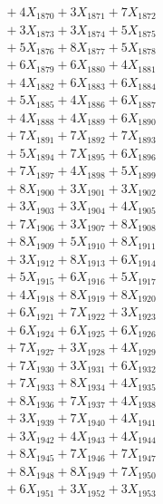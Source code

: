 \documentclass[a4paper,10pt]{article}
\begin{document}
{\begin{align}
&\;  + 4 X_{1870} + 3 X_{1871} + 7 X_{1872} \\[0.3ex]
&\;  + 3 X_{1873} + 3 X_{1874} + 5 X_{1875} \\[0.3ex]
&\;  + 5 X_{1876} + 8 X_{1877} + 5 X_{1878} \\[0.3ex]
&\;  + 6 X_{1879} + 6 X_{1880} + 4 X_{1881} \\[0.3ex]
&\;  + 4 X_{1882} + 6 X_{1883} + 6 X_{1884} \\[0.3ex]
&\;  + 5 X_{1885} + 4 X_{1886} + 6 X_{1887} \\[0.3ex]
&\;  + 4 X_{1888} + 4 X_{1889} + 6 X_{1890} \\[0.3ex]
&\;  + 7 X_{1891} + 7 X_{1892} + 7 X_{1893} \\[0.3ex]
&\;  + 5 X_{1894} + 7 X_{1895} + 6 X_{1896} \\[0.3ex]
&\;  + 7 X_{1897} + 4 X_{1898} + 5 X_{1899} \\[0.5ex]\allowbreak
&\;  + 8 X_{1900} + 3 X_{1901} + 3 X_{1902} \\[0.3ex]
&\;  + 3 X_{1903} + 3 X_{1904} + 4 X_{1905} \\[0.3ex]
&\;  + 7 X_{1906} + 3 X_{1907} + 8 X_{1908} \\[0.3ex]
&\;  + 8 X_{1909} + 5 X_{1910} + 8 X_{1911} \\[0.3ex]
&\;  + 3 X_{1912} + 8 X_{1913} + 6 X_{1914} \\[0.3ex]
&\;  + 5 X_{1915} + 6 X_{1916} + 5 X_{1917} \\[0.3ex]
&\;  + 4 X_{1918} + 8 X_{1919} + 8 X_{1920} \\[0.3ex]
&\;  + 6 X_{1921} + 7 X_{1922} + 3 X_{1923} \\[0.3ex]
&\;  + 6 X_{1924} + 6 X_{1925} + 6 X_{1926} \\[0.3ex]
&\;  + 7 X_{1927} + 3 X_{1928} + 4 X_{1929} \\[0.5ex]\allowbreak
&\;  + 7 X_{1930} + 3 X_{1931} + 6 X_{1932} \\[0.3ex]
&\;  + 7 X_{1933} + 8 X_{1934} + 4 X_{1935} \\[0.3ex]
&\;  + 8 X_{1936} + 7 X_{1937} + 4 X_{1938} \\[0.3ex]
&\;  + 3 X_{1939} + 7 X_{1940} + 4 X_{1941} \\[0.3ex]
&\;  + 3 X_{1942} + 4 X_{1943} + 4 X_{1944} \\[0.3ex]
&\;  + 8 X_{1945} + 7 X_{1946} + 7 X_{1947} \\[0.3ex]
&\;  + 8 X_{1948} + 8 X_{1949} + 7 X_{1950} \\[0.3ex]
&\;  + 6 X_{1951} + 3 X_{1952} + 3 X_{1953} \\[0.3ex]

\end{align}}
\end{document}

